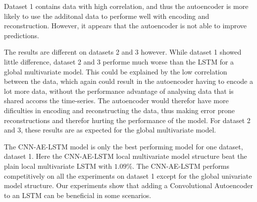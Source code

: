 Dataset 1 contains data with high correlation, and thus the autoencoder is more likely to use the additonal data to performe well with encoding and reconstruction.
However, it appears that the autoencoder is not able to improve predictions.


The results are different on datasets 2 and 3 however.
While dataset 1 showed little difference, dataset 2 and 3 performe much worse than the LSTM for a global multivariate model.
This could be explained by the low correlation between the data, which again could result in the autoencoder having to encode a lot more data,
without the performance advantage of analysing data that is shared accorss the time-series.
The autoencoder would therefor have more dificulties in encoding and reconstructing the data,
thus making error prone reconstructions and therefor hurting the performance of the model.
For dataset 2 and 3, these results are as expected for the global multivariate model.



















\iffalse
The CNN-AE-LSTM model is only the best performing model for one dataset, dataset 1.
Here the CNN-AE-LSTM local multivariate model structure beat the plain local multivariate LSTM with $1.09\%$.
The CNN-AE-LSTM performs competitively on all the experiments on dataset 1 except for the global univariate model structure.
Our experiments show that adding a Convolutional Autoencoder to an LSTM can be beneficial in some scenarios.


